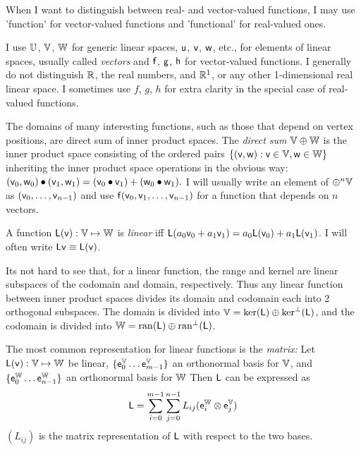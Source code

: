 When I want to distinguish between real- and vector-valued functions,
I may use 'function' for vector-valued functions and
'functional' for real-valued ones.

I use $\mathbb{U}$, $\mathbb{V}$, $\mathbb{W}$ for generic linear spaces,
$\mathsf{u}$, $\mathsf{v}$, $\mathsf{w}$, etc., for elements of linear spaces,
usually called \textit{vectors}
and
$\mathsf{f}$, $\mathsf{g}$, $\mathsf{h}$ for vector-valued functions.
I generally do not distinguish $\mathbb{R}$, the real numbers,
and $\mathbb{R}^1$, or any other 1-dimensional real linear space.
I sometimes use $f$, $g$, $h$ for extra clarity in the special
case of real-valued functions.

The domains of many interesting functions,
such as those that depend on vertex positions,
are direct sum of inner product spaces.
The \textit{direct sum} $\mathbb{V} \oplus \mathbb{W}$ is the inner product space
consisting of the ordered pairs $\{ (\mathsf{v},\mathsf{w}) : \mathsf{v} \in \mathbb{V}, \mathsf{w} \in \mathbb{W} \}$
inheriting the inner product space operations in the obvious way:
$(\mathsf{v}_0,\mathsf{w}_0) \bullet (\mathsf{v}_1,\mathsf{w}_1) = (\mathsf{v}_0 \bullet \mathsf{v}_1) + (\mathsf{w}_0 \bullet \mathsf{w}_1).$
I will usually write an element of $\oplus^n \mathbb{V}$ as
$(\mathsf{v}_0,\ldots,\mathsf{v}_{n-1})$
and use
$\mathsf{f}(\mathsf{v}_0,\mathsf{v}_1,\ldots,\mathsf{v}_{n-1})$
for a function that depends on $n$ vectors.

\label{sec:linear-functions}

A function $\mathsf{L}(\mathsf{v}):\mathbb{V} \mapsto \mathbb{W}$
is \textit{linear} iff
$\mathsf{L}(a_0 \mathsf{v}_0 + a_1 \mathsf{v}_1) = a_0 \mathsf{L}(\mathsf{v}_0) + a_1 \mathsf{L}(\mathsf{v}_1)$.
I will often write $\mathsf{L}\mathsf{v} \equiv \mathsf{L}(\mathsf{v})$.

Its not hard to see that, for a linear function,
the range and kernel are linear subspaces of the codomain and
domain, respectively.
Thus any linear function between inner product spaces
divides its domain and codomain each into 2 orthogonal subspaces.
The domain is divided into $\mathbb{V} = \mathrm{ker}(\mathsf{L}) \oplus \mathrm{ker}^{\perp}(\mathsf{L})$,
and the codomain is divided into $\mathbb{W} = \mathrm{ran}(\mathsf{L}) \oplus \mathrm{ran}^{\perp}(\mathsf{L})$.

The most common representation for linear functions is the \textit{matrix:}
Let $\mathsf{L}(\mathsf{v}):\mathbb{V} \mapsto \mathbb{W}$ be linear,
$\{ \mathsf{e}_0^{\mathbb{V}} \ldots  \mathsf{e}_{m-1}^{\mathbb{V}} \}$ an orthonormal basis for $\mathbb{V}$,
and
$\{ \mathsf{e}_0^{\mathbb{W}} \ldots \mathsf{e}_{n-1}^{\mathbb{W}} \}$ an orthonormal  basis for $\mathbb{W}$
Then $\mathsf{L}$ can be expressed as
\begin{equation}
\mathsf{L}
 =
\sum_{i=0}^{m-1} \sum_{j=0}^{n-1} L_{ij} ( \mathsf{e}_i^{\mathbb{W}} \otimes \mathsf{e}_j^{\mathbb{V}} )
\end{equation}
$(L_{ij})$ is the matrix representation of $\mathsf{L}$ with respect to
the two bases\cite{halmos-1958}.

